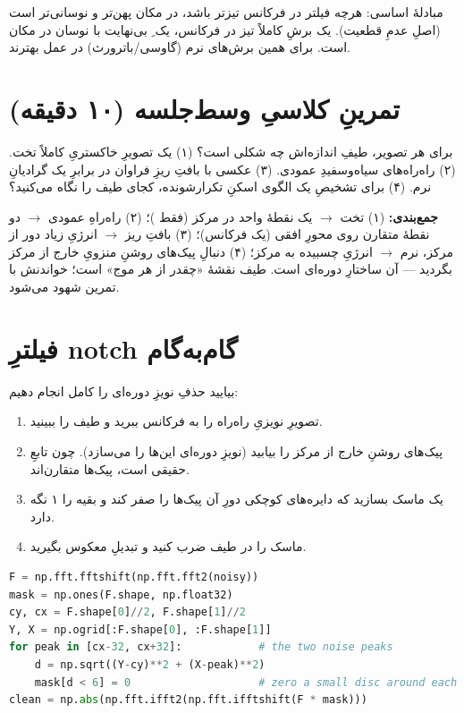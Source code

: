 \documentclass[12pt,a4paper]{article}
\begin{document}
\begin{hoshdar}
مبادلهٔ اساسی: هرچه فیلتر در فرکانس تیزتر باشد، در مکان پهن‌تر و نوسانی‌تر است (اصلِ عدمِ قطعیت).
یک برشِ کاملاً تیز در فرکانس، یک ِ بی‌نهایت با نوسان در مکان است. برای همین برش‌های نرم
(گاوسی/باترورث) در عمل بهترند.
\end{hoshdar}

\section{تمرینِ کلاسیِ وسط‌جلسه (۱۰ دقیقه)}

\begin{tamrin}
برای هر تصویر، طیفِ اندازه‌اش چه شکلی است؟ (۱) یک تصویرِ خاکستریِ کاملاً تخت. (۲) راه‌راه‌های
سیاه‌وسفیدِ عمودی. (۳) عکسی با بافتِ ریزِ فراوان در برابرِ یک گرادیانِ نرم. (۴) برای تشخیصِ یک
الگوی اسکنِ تکرارشونده، کجای طیف را نگاه می‌کنید؟
\end{tamrin}

\textbf{جمع‌بندی:} (۱) تخت $\rightarrow$ یک نقطهٔ واحد در مرکز (فقط )؛ (۲) راه‌راهِ عمودی
$\rightarrow$ دو نقطهٔ متقارن روی محورِ افقی (یک فرکانس)؛ (۳) بافتِ ریز $\rightarrow$ انرژیِ زیاد
دور از مرکز، نرم $\rightarrow$ انرژیِ چسبیده به مرکز؛ (۴) دنبالِ پیک‌های روشنِ منزویِ خارج از مرکز
بگردید — آن ساختارِ دوره‌ای است. طیف نقشهٔ «چقدر از هر موج» است؛ خواندنش با تمرین شهود می‌شود.

\section{فیلترِ notch گام‌به‌گام}

بیایید حذفِ نویزِ دوره‌ای را کامل انجام دهیم:

\begin{enumerate}
  \item تصویرِ نویزیِ راه‌راه را به فرکانس ببرید و طیف را ببینید.
  \item پیک‌های روشنِ خارج از مرکز را بیابید (نویزِ دوره‌ای این‌ها را می‌سازد). چون تابعِ حقیقی است، پیک‌ها متقارن‌اند.
  \item یک ماسک بسازید که دایره‌های کوچکی دورِ آن پیک‌ها را صفر کند و بقیه را ۱ نگه دارد.
  \item ماسک را در طیف ضرب کنید و تبدیلِ معکوس بگیرید.
\end{enumerate}

\begin{ltrcode}
\begin{lstlisting}[language=Python]
F = np.fft.fftshift(np.fft.fft2(noisy))
mask = np.ones(F.shape, np.float32)
cy, cx = F.shape[0]//2, F.shape[1]//2
Y, X = np.ogrid[:F.shape[0], :F.shape[1]]
for peak in [cx-32, cx+32]:            # the two noise peaks
    d = np.sqrt((Y-cy)**2 + (X-peak)**2)
    mask[d < 6] = 0                    # zero a small disc around each
clean = np.abs(np.fft.ifft2(np.fft.ifftshift(F * mask)))
\end{lstlisting}
\end{ltrcode}
\end{document}
